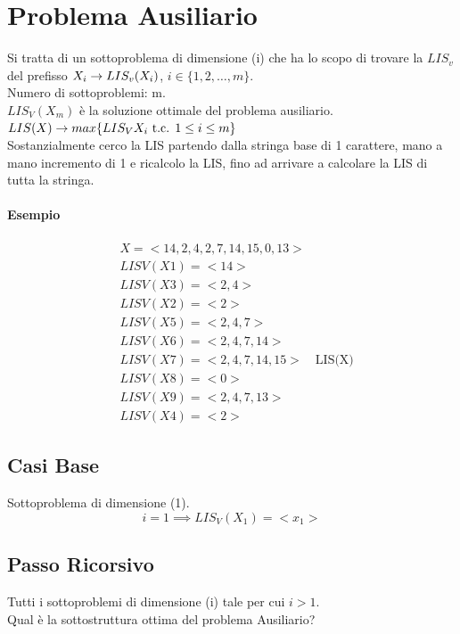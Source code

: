 \section{Problema Ausiliario}
Si tratta di un sottoproblema di dimensione (i) che ha lo scopo di trovare la $LIS_v$ del
prefisso $X_i \rightarrow LIS_v(X_i)$, $i \in \{1,2,\dots,m\}$.\\
Numero di sottoproblemi: m.\\
$LIS_V(X_m)$ \ra è la soluzione ottimale del problema ausiliario.\\
$LIS(X) \rightarrow max\{LIS_V{X_i} \text{ t.c. } 1 \leq i \leq m\}$\\
Sostanzialmente cerco la LIS partendo dalla stringa base di 1 carattere, mano a mano
incremento di 1 e ricalcolo la LIS, fino ad arrivare a calcolare la LIS di tutta la stringa.
\paragraph*{Esempio}
\begin{align*}
    &X = <14, 2, 4, 2, 7, 14, 15, 0, 13>\\
    &LISV(X1) = <14>\\
    &LISV(X3) = <2, 4>\\
    &LISV(X2) = <2>\\
    &LISV(X5) = <2, 4, 7>\\
    &LISV(X6) = <2, 4, 7, 14>\\
    &LISV(X7) = <2, 4, 7, 14, 15> \quad \text{LIS(X)}\\
    &LISV(X8) = <0>\\
    &LISV(X9) = <2, 4, 7, 13>\\
    &LISV(X4) = <2>
\end{align*}
\subsection{Casi Base}
\ra Sottoproblema di dimensione (1).
\[i = 1 \implies LIS_V(X_1) = <x_1>\]
\subsection{Passo Ricorsivo}
\ra Tutti i sottoproblemi di dimensione (i) tale per cui $i >1$.\\
Qual è la sottostruttura ottima del problema Ausiliario?\\
